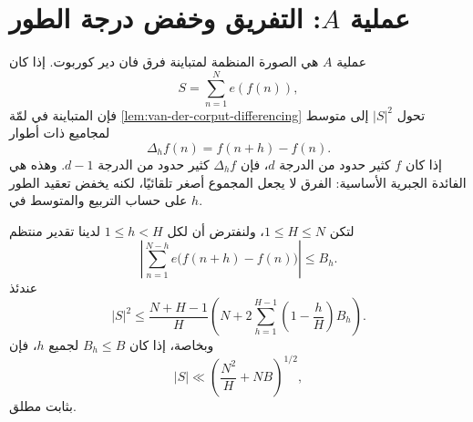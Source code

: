 \begin{antfigure}
\caption{إغلاق منطقة الأزواج الأسية \((\kappa,\lambda)\) من
التعريف~\ref{def:exponent-pair-framework}: المثلث المفتوح
\(\{0\le\kappa\le\frac12\le\lambda\le1,\ \kappa+\lambda<1\}\) مع نقطتيه
الحديّتين المصرَّح بهما صراحةً \((0,1)\) و\(\left(\frac12,\frac12\right)\).
الحد المائل \(\kappa+\lambda=1\) غير محتوًى فعليًا إلا عند هاتين النقطتين؛
التظليل يمثل الإغلاق لغرض العرض لا المجموعة المفتوحة بحرفيتها.}
\label{fig:exponent-pair-region}
\end{antfigure}

\section{عملية \(A\): التفريق وخفض درجة الطور}

عملية \(A\) هي الصورة المنظمة لمتباينة فرق فان دير كوربوت. إذا كان
\[
S=\sum_{n=1}^{N}e(f(n)),
\]
فإن المتباينة في لمّة \ref{lem:van-der-corput-differencing} تحول \(|S|^2\) إلى متوسط لمجاميع ذات أطوار
\[
\Delta_h f(n)=f(n+h)-f(n).
\]
إذا كان \(f\) كثير حدود من الدرجة \(d\)، فإن \(\Delta_hf\) كثير حدود من الدرجة \(d-1\). وهذه هي الفائدة الجبرية الأساسية: الفرق لا يجعل المجموع أصغر تلقائيًا، لكنه يخفض تعقيد الطور على حساب التربيع والمتوسط في \(h\).

\begin{proposition}
\label{prop:a-process-limited}
لتكن \(1\le H\le N\)، ولنفترض أن لكل \(1\le h<H\) لدينا تقدير منتظم
\[
\left|\sum_{n=1}^{N-h}e\bigl(f(n+h)-f(n)\bigr)\right|
\le B_h.
\]
عندئذ
\[
|S|^2
\le
\frac{N+H-1}{H}
\left(
N+2\sum_{h=1}^{H-1}
\left(1-\frac{h}{H}\right)B_h
\right).
\]
وبخاصة، إذا كان \(B_h\le B\) لجميع \(h\)، فإن
\[
|S|
\ll
\left(\frac{N^2}{H}+NB\right)^{1/2},
\]
بثابت مطلق.
\provedhere
\end{proposition}

